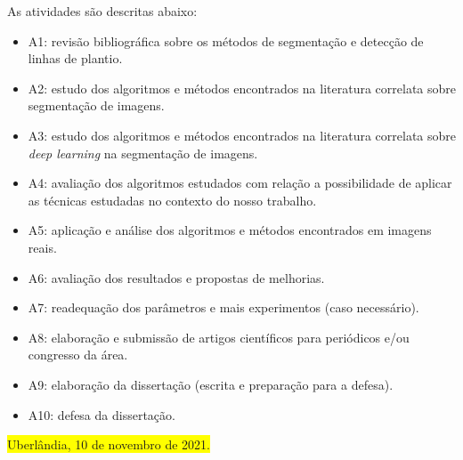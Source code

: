 \documentclass[12pt, a4paper, english, brazil]{article}
\newcommand{\boxYellow}[1]{\colorbox{yellow}{#1}}
\begin{document}
As atividades são descritas abaixo:

\begin{itemize}
    \item A1: revisão bibliográfica sobre os métodos de segmentação e detecção de linhas de plantio.
    \item A2: estudo dos algoritmos e métodos encontrados na literatura correlata sobre segmentação de imagens.
    \item A3: estudo dos algoritmos e métodos encontrados na literatura correlata sobre \textit{deep learning} na segmentação de imagens.
    \item A4: avaliação dos algoritmos estudados com relação a possibilidade de aplicar as técnicas estudadas no contexto do nosso trabalho.
    \item A5: aplicação e análise dos algoritmos e métodos encontrados em imagens reais.
    \item A6: avaliação dos resultados e propostas de melhorias.
    \item A7: readequação dos parâmetros e mais experimentos (caso necessário).
    \item A8: elaboração e submissão de artigos científicos para periódicos e/ou congresso da área.
    \item A9: elaboração da dissertação (escrita e preparação para a defesa).
    \item A10: defesa da dissertação.
\end{itemize}



\bigskip
\noindent \boxYellow{Uberlândia, 10 de novembro de 2021.}


\end{document}
